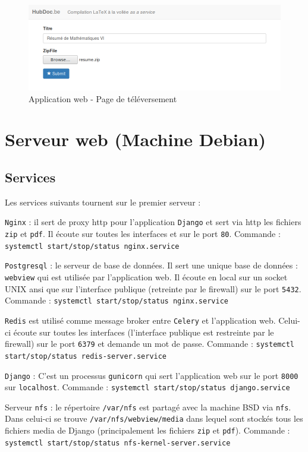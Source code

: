 \documentclass[10pt,a4paper]{article}
\begin{document}
\begin{figure}[!h]
   \centering
   \includegraphics[scale=0.4]{hubdoc-upload.png}
   \caption{\label{app2} Application web - Page de téléversement}
\end{figure}

\section{Serveur web (Machine Debian)}
\subsection{Services}
Les services suivants tournent sur le premier serveur :

\texttt{Nginx} : il sert de proxy http pour l'application \texttt{Django} et sert via http les fichiers \texttt{zip} et \texttt{pdf}.
Il écoute sur toutes les interfaces et sur le port \texttt{80}.
Commande : \texttt{systemctl start/stop/status nginx.service}

\texttt{Postgresql} : le serveur de base de données.
Il sert une unique base de données : \texttt{webview} qui est utilisée par l'application web.
Il écoute en local sur un socket UNIX ansi que sur l'interface publique (retreinte par le firewall) sur le port \texttt{5432}.
Commande : \texttt{systemctl start/stop/status nginx.service}

\texttt{Redis} est utilisé comme message broker entre \texttt{Celery} et l'application web.
Celui-ci écoute sur toutes les interfaces (l'interface publique est restreinte par le firewall) sur le port \texttt{6379} et demande un mot de passe.
Commande : \texttt{systemctl start/stop/status redis-server.service}

\texttt{Django} : C'est un processus \texttt{gunicorn} qui sert l'application web sur le port \texttt{8000} sur \texttt{localhost}.
Commande : \texttt{systemctl start/stop/status django.service}

Serveur \texttt{nfs} : le répertoire \texttt{/var/nfs} est partagé avec la machine BSD via \texttt{nfs}.
Dans celui-ci se trouve \texttt{/var/nfs/webview/media} dans lequel sont stockés tous les fichiers media de Django (principalement les fichiers \texttt{zip} et \texttt{pdf}).
Commande : \texttt{systemctl start/stop/status nfs-kernel-server.service}
\end{document}
